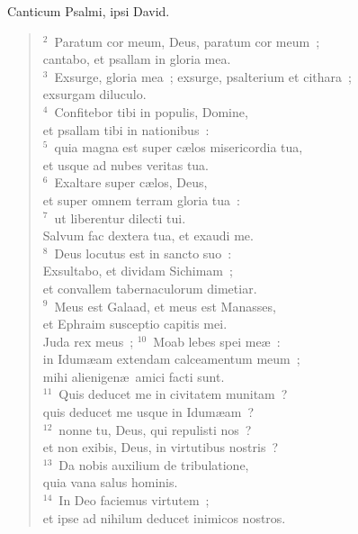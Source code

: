\bchapter
\lettrine[lines=3,image=true,loversize=0.05,lraise=-0.03]{C}{}anticum Psalmi, ipsi David.
\begin{flushleft}\begin{verse}\vspace{6pt}${}^{2}$~Paratum cor meum, Deus, paratum cor meum~;\\ cantabo, et psallam in gloria mea.\\
${}^{3}$~Exsurge, gloria mea~; exsurge, psalterium et cithara~;\\ exsurgam diluculo.\\
${}^{4}$~Confitebor tibi in populis, Domine,\\ et psallam tibi in nationibus~:\\
${}^{5}$~quia magna est super c\ae los misericordia tua,\\ et usque ad nubes veritas tua.\\
${}^{6}$~Exaltare super c\ae los, Deus,\\ et super omnem terram gloria tua~:\\
${}^{7}$~ut liberentur dilecti tui.\\ Salvum fac dextera tua, et exaudi me.\\
${}^{8}$~Deus locutus est in sancto suo~:\\ Exsultabo, et dividam Sichimam~;\\ et convallem tabernaculorum dimetiar.\\
${}^{9}$~Meus est Galaad, et meus est Manasses,\\ et Ephraim susceptio capitis mei.\\ Juda rex meus~;
${}^{10}$~Moab lebes spei me\ae~:\\ in Idum\ae am extendam calceamentum meum~;\\ mihi alienigen\ae\ amici facti sunt.\\
${}^{11}$~Quis deducet me in civitatem munitam~?\\ quis deducet me usque in Idum\ae am~?\\
${}^{12}$~nonne tu, Deus, qui repulisti nos~?\\ et non exibis, Deus, in virtutibus nostris~?\\
${}^{13}$~Da nobis auxilium de tribulatione,\\ quia vana salus hominis.\\
${}^{14}$~In Deo faciemus virtutem~;\\ et ipse ad nihilum deducet inimicos nostros.\end{verse}\end{flushleft}



